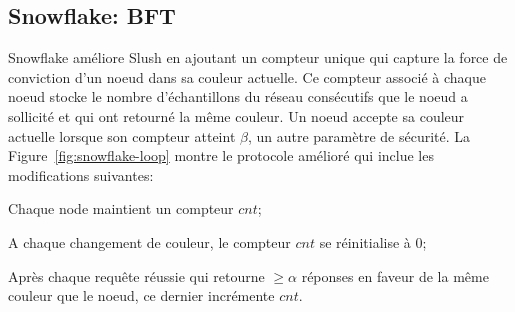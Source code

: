 \documentclass[letterpaper,twocolumn,10pt]{article}
\theoremstyle{definition}
\begin{document}
\subsection{Snowflake: BFT}

Snowflake améliore Slush en ajoutant un compteur unique qui capture la force de conviction d'un noeud dans sa couleur
actuelle. Ce compteur associé à chaque noeud stocke le nombre d'échantillons du réseau consécutifs que le noeud a
sollicité et qui ont retourné la même couleur. Un noeud accepte sa couleur actuelle lorsque son compteur atteint $\beta$,
un autre paramètre de sécurité. La Figure~\ref{fig:snowflake-loop} montre le protocole amélioré qui inclue les
modifications suivantes:


\begin{compactenum}
	\item Chaque node maintient un compteur $\mathit{cnt}$;
    \item A chaque changement de couleur, le compteur $\mathit{cnt}$ se réinitialise à 0;
    \item Après chaque requête réussie qui retourne $\ge \alpha$ réponses en faveur de la même couleur que le noeud,
      ce dernier incrémente $\mathit{cnt}$.
\end{compactenum}

\end{document}
